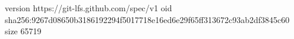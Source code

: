 version https://git-lfs.github.com/spec/v1
oid sha256:9267d08650b3186192294f5017718e16ed6e29f65ff313672c93ab2df3845c60
size 65719
